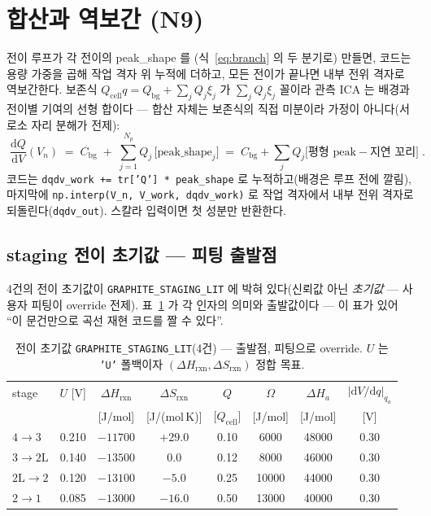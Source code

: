 \documentclass[11pt,a4paper]{article}
\newcommand{\dd}{\mathrm{d}}
\newcommand{\cell}{\mathrm{cell}}
\newcommand{\bg}{\mathrm{bg}}
\newcommand{\rxn}{\mathrm{rxn}}
\newcommand{\code}[1]{\texttt{#1}}
\begin{document}
\section{합산과 역보간 (N9)}\label{sec:sum}
전이 루프가 각 전이의 peak\_shape 를 (식~\eqref{eq:branch} 의 두 분기로) 만들면, 코드는 용량 가중을 곱해 작업 격자 위
누적에 더하고, 모든 전이가 끝나면 내부 전위 격자로 역보간한다. 보존식 $Q_\cell q=Q_\bg+\sum_jQ_j\xi_j$ 가
$\sum_jQ_j\xi_j$ 꼴이라 관측 ICA 는 배경과 전이별 기여의 선형 합이다 — 합산 자체는 보존식의 직접 미분이라 가정이
아니다(서로소 자리 분해가 전제):
\begin{equation}
\boxed{\;\frac{\dd Q}{\dd V}(V_n)\;=\;C_\bg\;+\;\sum_{j=1}^{N_p}Q_j\,
\big[\text{peak\_shape}_j\big]
\;=\;C_\bg+\sum_jQ_j\big[\text{평형 peak}-\text{지연 꼬리}\big]\;.}
\label{eq:sum}
\end{equation}
코드는 \code{dqdv\_work += tr['Q'] * peak\_shape} 로 누적하고(배경은 루프 전에 깔림), 마지막에
\code{np.interp(V\_n, V\_work, dqdv\_work)} 로 작업 격자에서 내부 전위 격자로 되돌린다(\code{dqdv\_out}).
스칼라 입력이면 첫 성분만 반환한다.

\subsection{staging 전이 초기값 — 피팅 출발점}
4건의 전이 초기값이 \code{GRAPHITE\_STAGING\_LIT} 에 박혀 있다(신뢰값 아닌 \emph{초기값} — 사용자 피팅이 override
전제). 표~\ref{tab:staging} 가 각 인자의 의미와 출발값이다 — 이 표가 있어 ``이 문건만으로 곡선 재현 코드를 짤 수 있다''.

\begin{table}[t]
\centering
\renewcommand{\arraystretch}{1.25}
\caption{전이 초기값 \code{GRAPHITE\_STAGING\_LIT}(4건) — 출발점, 피팅으로 override. $U$ 는 \code{'U'}
폴백이자 $(\Delta H_\rxn,\Delta S_\rxn)$ 정합 목표.}
\label{tab:staging}
\begin{tabular}{l c c c c c c c}
\toprule
stage & $U$ [V] & $\Delta H_\rxn$ & $\Delta S_\rxn$ & $Q$ & $\Omega$ & $\Delta H_a$ & $|\dd V/\dd q|_{q_a}$ \\
 &  & [J/mol] & [J/(mol\,K)] & [$Q_\cell$] & [J/mol] & [J/mol] & [V] \\
\midrule
$4\!\to\!3$   & 0.210 & $-11700$ & $+29.0$ & 0.10 & 6000  & 48000 & 0.30 \\
$3\!\to\!2\mathrm L$ & 0.140 & $-13500$ & $0.0$   & 0.12 & 8000  & 46000 & 0.30 \\
$2\mathrm L\!\to\!2$ & 0.120 & $-13100$ & $-5.0$  & 0.25 & 10000 & 44000 & 0.30 \\
$2\!\to\!1$   & 0.085 & $-13000$ & $-16.0$ & 0.50 & 13000 & 40000 & 0.30 \\
\bottomrule
\end{tabular}
\end{table}
\end{document}
